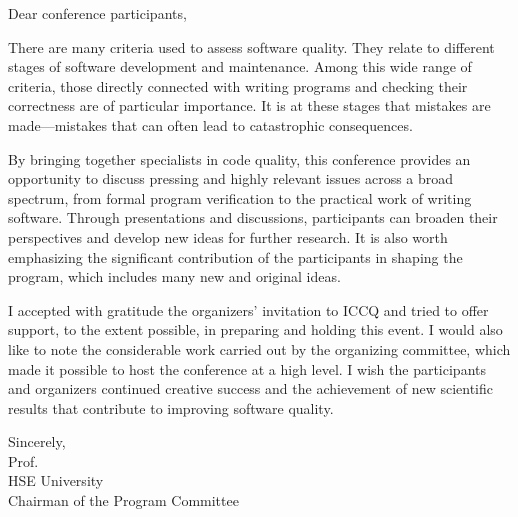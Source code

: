 
\cleardoublepage
{}

Dear conference participants,

There are many criteria used to assess software quality.
They relate to different stages of software development and maintenance.
Among this wide range of criteria, those directly connected with writing programs and checking their correctness are of particular importance.
It is at these stages that mistakes are made—mistakes that can often lead to catastrophic consequences.

By bringing together specialists in code quality, this conference provides an opportunity to discuss pressing and highly relevant issues across a broad spectrum, from formal program verification to the practical work of writing software.
Through presentations and discussions, participants can broaden their perspectives and develop new ideas for further research.
It is also worth emphasizing the significant contribution of the participants in shaping the program, which includes many new and original ideas.

I accepted with gratitude the organizers’ invitation to ICCQ and tried to offer support, to the extent possible, in preparing and holding this event.
I would also like to note the considerable work carried out by the organizing committee, which made it possible to host the conference at a high level.
I wish the participants and organizers continued creative success and the achievement of new scientific results that contribute to improving software quality.

\vspace{18pt}
Sincerely,\\
Prof. \\
HSE University \\
Chairman of the Program Committee \\
